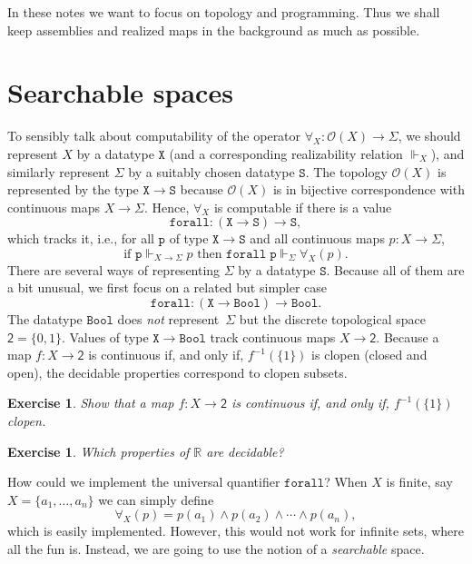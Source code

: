 \documentclass[a4paper,10pt]{article}
\newtheorem{exercise}[theorem]{Exercise}
\newcommand{\RR}{\mathbb{R}}
\newcommand{\set}[1]{\{#1\}}
\newcommand{\tpl}[1]{\mathcal{O}(#1)}
\newcommand{\two}{\mathsf{2}}
\newcommand{\Bool}{\mathtt{Bool}}
\newcommand{\R}[1]{\mathtt{#1}}
\newcommand{\rz}{\Vdash}
\begin{document}
In these notes we want to focus on topology and programming. Thus we shall keep assemblies and realized maps in the background as much as possible.


\section{Searchable spaces}
\label{sec:searchable-spaces}

To sensibly talk about computability of the operator $\forall_X : \tpl{X} \to \Sigma$, we should represent $X$ by a datatype $\mathtt{X}$ (and a corresponding realizability relation $\rz_X$), and similarly represent $\Sigma$ by a suitably chosen datatype $\mathtt{S}$. The topology $\tpl{X}$ is represented by the type $\mathtt{X} \to \mathtt{S}$ because $\tpl{X}$ is in bijective correspondence with continuous maps $X \to \Sigma$. Hence, $\forall_X$ is computable if there is a value
%
\begin{equation*} \R{forall} : (\mathtt{X} \to \mathtt{S}) \to \mathtt{S},
\end{equation*}
%
which tracks it, i.e., for all $\R{p}$ of type $\mathtt{X} \to \mathtt{S}$ and all continuous maps $p : X \to \Sigma$,
%
\begin{equation*} \text{if $\R{p} \rz_{X \to \Sigma} p$ then $\R{forall}\;\R{p} \rz_\Sigma \forall_X(p)$.}
\end{equation*}
%
There are several ways of representing $\Sigma$ by a datatype $\mathtt{S}$. Because all of them are a bit unusual, we first focus on a related but simpler case
%
\begin{equation}
  \label{eq:forall-bool} \mathtt{forall} : (\mathtt{X} \to \Bool) \to \Bool.
\end{equation}
%
The datatype $\Bool$ does \emph{not} represent~$\Sigma$ but the discrete topological space $\two = \set{0, 1}$. Values of type $\mathtt{X} \to \Bool$ track continuous maps $X \to \two$. Because a map $f : X \to \two$ is continuous if, and only if, $f^{-1}(\set{1})$ is clopen (closed and open), the decidable properties correspond to clopen subsets.

\begin{exercise} Show that a map $f : X \to \two$ is continuous if, and only if, $f^{-1}(\set{1})$ clopen.
\end{exercise}

\begin{exercise} Which properties of $\RR$ are decidable?
\end{exercise}
%
How could we implement the universal quantifier $\mathtt{forall}$? When $X$ is finite, say $X = \set{a_1, \ldots, a_n}$ we can simply define
%
\begin{equation*} \forall_X(p) = p(a_1) \land p(a_2) \land \cdots \land p(a_n),
\end{equation*}
%
which is easily implemented.
%
However, this would not work for infinite sets, where all the fun is. Instead, we are going to use the notion of a \emph{searchable} space.
\end{document}
